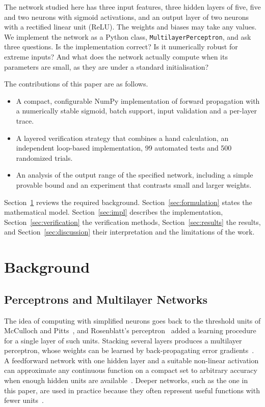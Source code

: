 \documentclass[10pt,letterpaper,twocolumn]{article}
\begin{document}
The network studied here has three input features, three hidden layers of five, five and two neurons with sigmoid activations, and an output layer of two neurons with a rectified linear unit (ReLU). The weights and biases may take any values. We implement the network as a Python class, \texttt{MultilayerPerceptron}, and ask three questions. Is the implementation correct? Is it numerically robust for extreme inputs? And what does the network actually compute when its parameters are small, as they are under a standard initialisation?

The contributions of this paper are as follows.
\begin{itemize}
\item A compact, configurable NumPy implementation of forward propagation with a numerically stable sigmoid, batch support, input validation and a per-layer trace.
\item A layered verification strategy that combines a hand calculation, an independent loop-based implementation, 99 automated tests and 500 randomized trials.
\item An analysis of the output range of the specified network, including a simple provable bound and an experiment that contrasts small and larger weights.
\end{itemize}

Section~\ref{sec:background} reviews the required background. Section~\ref{sec:formulation} states the mathematical model. Section~\ref{sec:impl} describes the implementation, Section~\ref{sec:verification} the verification methods, Section~\ref{sec:results} the results, and Section~\ref{sec:discussion} their interpretation and the limitations of the work.

\section{Background}\label{sec:background}
\subsection{Perceptrons and Multilayer Networks}
The idea of computing with simplified neurons goes back to the threshold units of McCulloch and Pitts~\cite{mcculloch1943}, and Rosenblatt's perceptron~\cite{rosenblatt1958} added a learning procedure for a single layer of such units. Stacking several layers produces a multilayer perceptron, whose weights can be learned by back-propagating error gradients~\cite{rumelhart1986}. A feedforward network with one hidden layer and a suitable non-linear activation can approximate any continuous function on a compact set to arbitrary accuracy when enough hidden units are available~\cite{cybenko1989,hornik1989}. Deeper networks, such as the one in this paper, are used in practice because they often represent useful functions with fewer units~\cite{lecun2015,goodfellow2016}.
\end{document}
